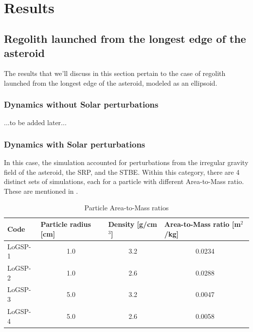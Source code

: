 \chapter{Results}
\label{results}
\graphicspath{{Results/Images/}}

\section{Regolith launched from the longest edge of the asteroid}
\label{regolith_longest_edge}
The results that we'll discuss in this section pertain to the case of regolith launched from the longest edge of the asteroid, modeled as an ellipsoid.

\subsection{Dynamics without Solar perturbations}
\label{regolith_longest_edge_without_solar}
...to be added later...

\subsection{Dynamics with Solar perturbations}
\label{regolith_longest_edge_with_solar}
In this case, the simulation accounted for perturbations from the irregular gravity field of the asteroid, the \gls{SRP}, and the \gls{STBE}. Within this category, there are 4 distinct sets of simulations, each for a particle with different Area-to-Mass ratio. These are mentioned in .
\begin{table}[]
\centering
\captionsetup{justification=centering}
\caption{Particle Area-to-Mass ratios}
\label{tab:area_to_mass_ratio}
\begin{tabular}{|l|c|c|c|}
\hline
Code    & \multicolumn{1}{l|}{Particle radius {[}cm{]}} & \multicolumn{1}{l|}{Density {[}g/cm$^3${]}} & \multicolumn{1}{l|}{Area-to-Mass ratio {[}m$^2$/kg{]}} \\ \hline
LoGSP-1     &   1.0     &   3.2     &   0.0234      \\ \hline
LoGSP-2     &   1.0     &   2.6     &   0.0288      \\ \hline
LoGSP-3     &   5.0     &   3.2     &   0.0047      \\ \hline
LoGSP-4     &   5.0     &   2.6     &   0.0058      \\ \hline
\end{tabular}
\end{table}

